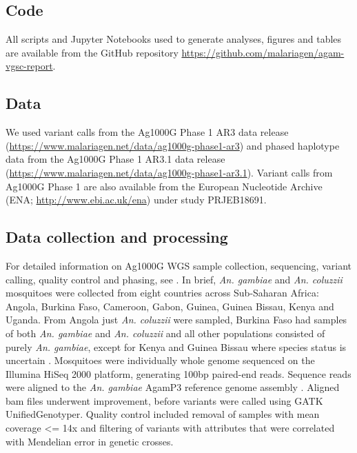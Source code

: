 \documentclass[a4paper,11pt,abstracton,hidelinks]{scrartcl}
\begin{document}
\subsection*{Code}

%
All scripts and Jupyter Notebooks used to generate analyses, figures and tables are available from the GitHub repository \url{https://github.com/malariagen/agam-vgsc-report}.


\subsection*{Data}

%
We used variant calls from the Ag1000G Phase 1 AR3 data release (\url{https://www.malariagen.net/data/ag1000g-phase1-ar3}) and phased haplotype data from the Ag1000G Phase 1 AR3.1 data release (\url{https://www.malariagen.net/data/ag1000g-phase1-ar3.1}).
%
Variant calls from Ag1000G Phase 1 are also available from the European Nucleotide Archive (ENA; \url{http://www.ebi.ac.uk/ena}) under study PRJEB18691.


\subsection*{Data collection and processing}

%
For detailed information on Ag1000G WGS sample collection, sequencing, variant calling, quality control and phasing, see \cite{Ag1000gConsortium2017}.
%
In brief, \emph{An. gambiae} and \emph{An. coluzzii} mosquitoes were collected from eight countries across Sub-Saharan Africa: Angola, Burkina Faso, Cameroon, Gabon, Guinea, Guinea Bissau, Kenya and Uganda.
%
From Angola just \emph{An. coluzzii} were sampled, Burkina Faso had samples of both \emph{An. gambiae} and \emph{An. coluzzii} and all other populations consisted of purely \emph{An. gambiae}, except for Kenya and Guinea Bissau where species status is uncertain \cite{Ag1000gConsortium2017}.
%
Mosquitoes were individually whole genome sequenced on the Illumina HiSeq 2000 platform, generating 100bp paired-end reads.
%
Sequence reads were aligned to the \emph{An. gambiae} AgamP3 reference genome assembly \cite{Holt2002}.
%
Aligned bam files underwent improvement, before variants were called using GATK UnifiedGenotyper.
%
Quality control included removal of samples with mean coverage <= 14x and filtering of variants with attributes that were correlated with Mendelian error in genetic crosses.
\end{document}
